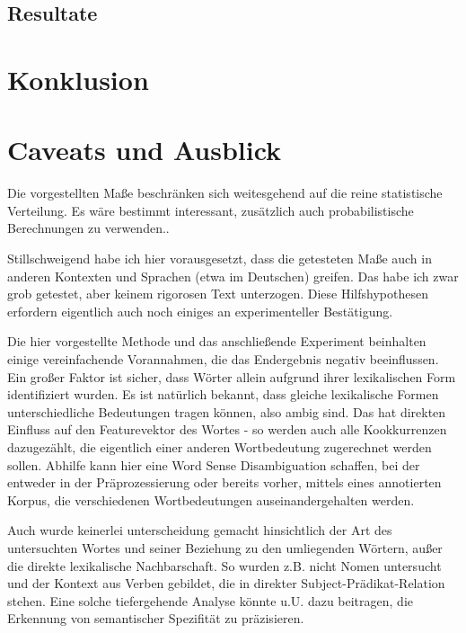 \documentclass[11pt,numbers=noenddot]{scrartcl}
\begin{document}
\subsection{Resultate}

\section{Konklusion}

\section{Caveats und Ausblick} \label{ausblick}

Die vorgestellten Maße beschränken sich weitesgehend auf die reine statistische Verteilung. Es wäre bestimmt interessant, zusätzlich auch probabilistische Berechnungen zu verwenden..

Stillschweigend habe ich hier vorausgesetzt, dass die getesteten Maße auch in anderen Kontexten und Sprachen (etwa im Deutschen) greifen. Das habe ich zwar grob getestet, aber keinem rigorosen Text unterzogen. Diese Hilfshypothesen erfordern eigentlich auch noch einiges an experimenteller Bestätigung.

 Die hier vorgestellte Methode und das anschließende Experiment beinhalten einige vereinfachende Vorannahmen, die das Endergebnis negativ beeinflussen. Ein großer Faktor ist sicher, dass Wörter allein aufgrund ihrer lexikalischen Form identifiziert wurden. Es ist natürlich bekannt, dass gleiche lexikalische Formen unterschiedliche Bedeutungen tragen können, also ambig sind. Das hat direkten Einfluss auf den Featurevektor des Wortes - so werden auch alle Kookkurrenzen dazugezählt, die eigentlich einer anderen Wortbedeutung zugerechnet werden sollen. Abhilfe kann hier eine Word Sense Disambiguation schaffen, bei der entweder in der Präprozessierung oder bereits vorher, mittels eines annotierten Korpus, die verschiedenen Wortbedeutungen auseinandergehalten werden.

 Auch wurde keinerlei unterscheidung gemacht hinsichtlich der Art des untersuchten Wortes und seiner Beziehung zu den umliegenden Wörtern, außer die direkte lexikalische Nachbarschaft. So wurden z.B. nicht Nomen untersucht und der Kontext aus Verben gebildet, die in direkter Subject-Prädikat-Relation stehen. Eine solche tiefergehende Analyse könnte u.U. dazu beitragen, die Erkennung von semantischer Spezifität zu präzisieren.
\end{document}
